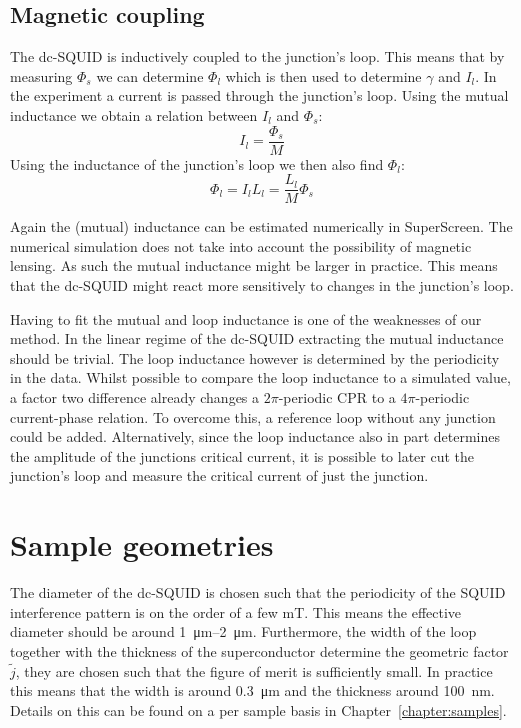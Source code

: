 \subsection{Magnetic coupling}
\label{sec:magnetic-coupling}
The dc-SQUID is inductively coupled to the junction's loop. This means that by measuring $\Phi_s$ we can determine $\Phi_l$ which is then used to determine $\gamma$ and $I_l$. In the experiment a current is passed through the junction's loop. Using the mutual inductance we obtain a relation between $I_l$ and $\Phi_s$:
\begin{equation}
	I_l = \frac{\Phi_s}{M}
\end{equation}
Using the inductance of the junction's loop we then also find $\Phi_l$:
\begin{equation}
	\Phi_l = I_lL_l = \frac{L_l}{M}\Phi_s
\end{equation}

Again the (mutual) inductance can be estimated numerically in SuperScreen.\cite{bishop-vanhornSuperScreenOpensourcePackage2022} The numerical simulation does not take into account the possibility of magnetic lensing.\cite{prigozhin3DSimulationSuperconducting2018} As such the mutual inductance might be larger in practice. This means that the dc-SQUID might react more sensitively to changes in the junction's loop.

Having to fit the mutual and loop inductance is one of the weaknesses of our method. In the linear regime of the dc-SQUID extracting the mutual inductance should be trivial. The loop inductance however is determined by the periodicity in the data. Whilst possible to compare the loop inductance to a simulated value, a factor two difference already changes a $2\pi$-periodic CPR to a $4\pi$-periodic current-phase relation. To overcome this, a reference loop without any junction could be added. Alternatively, since the loop inductance also in part determines the amplitude of the junctions critical current, it is possible to later cut the junction's loop and measure the critical current of just the junction.

\section{Sample geometries}
The diameter of the dc-SQUID is chosen such that the periodicity of the SQUID interference pattern is on the order of a few \unit{\milli\tesla}. This means the effective diameter should be around \qtyrange{1}{2}{\micro\meter}. Furthermore, the width of the loop together with the thickness of the superconductor determine the geometric factor $\tilde{j}$, they are chosen such that the figure of merit is sufficiently small. In practice this means that the width is around \qty{0.3}{\micro\meter} and the thickness around \qty{100}{\nano\meter}. Details on this can be found on a per sample basis in Chapter~\ref{chapter:samples}.

